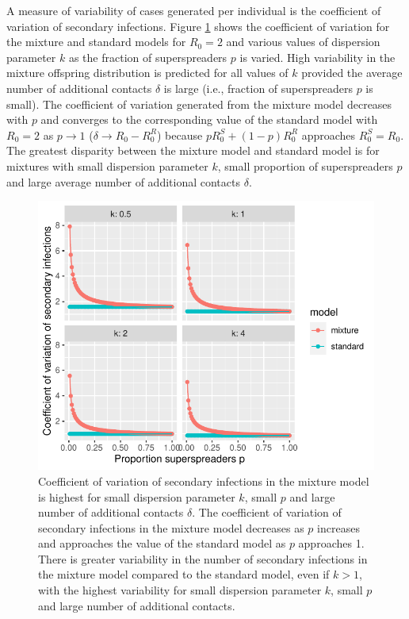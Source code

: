 \documentclass{imammb}
\numberwithin{equation}{section}
\begin{document}
 A measure of variability of cases generated per individual is the coefficient of variation of secondary infections.  Figure \ref{fig:CVcases} shows the coefficient of variation for the mixture and standard models for $R_0=2$ and various values of dispersion parameter $k$ as the fraction of superspreaders $p$ is varied. High variability in the mixture offspring distribution is predicted for all values of $k$ provided the average number of additional contacts $\delta$ is large (i.e., fraction of superspreaders $p$ is small). The coefficient of variation generated from the mixture model decreases with $p$ and converges to the corresponding value of the standard model with $R_0=2$ as $p\rightarrow 1$ ($\delta\rightarrow R_0-R_0^R$) because $p R_0^S+(1-p)R_0^R$ approaches $R_0^S = R_0$. The greatest disparity between the mixture model and standard model is for mixtures with small dispersion parameter $k$, small proportion of superspreaders $p$ and large average number of additional contacts $\delta$. 
 
 \begin{figure}
    \centering
    \includegraphics{Figure4.pdf}
    \caption{Coefficient of variation of secondary infections in the mixture model is highest for small dispersion parameter $k$, small $p$ and large number of additional contacts $\delta$. The coefficient of variation of secondary infections in the mixture model decreases as $p$ increases and approaches the value of the standard model as $p$ approaches 1. There is greater variability in the number of secondary infections in the mixture model compared to the standard model, even if $k>1$, with the highest variability for small dispersion parameter $k$, small $p$ and large number of additional contacts.  }
    \label{fig:CVcases}
\end{figure}
\end{document}
